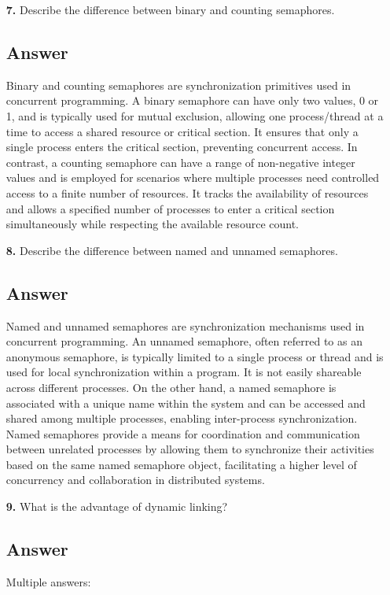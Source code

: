 \documentclass[12pt]{book}
\begin{document}
\begin{itemize}
        \begin{itemize}
            \item[\textbf{7.}] Describe the difference between binary and counting semaphores.
            
            \subsection*{Answer}
            Binary and counting semaphores are synchronization primitives used in concurrent programming. A binary semaphore can have only two values, 0 or 1, and is typically used for mutual exclusion, allowing one process/thread at a time to access a shared resource or critical section. It ensures that only a single process enters the critical section, preventing concurrent access. In contrast, a counting semaphore can have a range of non-negative integer values and is employed for scenarios where multiple processes need controlled access to a finite number of resources. It tracks the availability of resources and allows a specified number of processes to enter a critical section simultaneously while respecting the available resource count.

            \item[\textbf{8.}] Describe the difference between named and unnamed semaphores.
            \subsection*{Answer}
            Named and unnamed semaphores are synchronization mechanisms used in concurrent programming. An unnamed semaphore, often referred to as an anonymous semaphore, is typically limited to a single process or thread and is used for local synchronization within a program. It is not easily shareable across different processes. On the other hand, a named semaphore is associated with a unique name within the system and can be accessed and shared among multiple processes, enabling inter-process synchronization. Named semaphores provide a means for coordination and communication between unrelated processes by allowing them to synchronize their activities based on the same named semaphore object, facilitating a higher level of concurrency and collaboration in distributed systems.
            \item[\textbf{9.}] What is the advantage of dynamic linking?
            \subsection*{Answer}
            Multiple answers:


\end{itemize}
\end{itemize}
\end{document}
